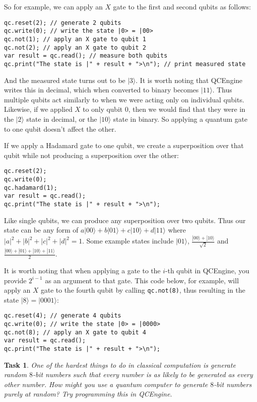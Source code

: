 \documentclass[twocolumn]{article}
\newtheorem{task}{Task}[section]
\begin{document}
So for example, we can apply an $X$ gate to the first and second qubits as follows:

\begin{lstlisting}
qc.reset(2); // generate 2 qubits
qc.write(0); // write the state |0> = |00>
qc.not(1); // apply an X gate to qubit 1
qc.not(2); // apply an X gate to qubit 2
var result = qc.read(); // measure both qubits
qc.print("The state is |" + result + ">\n"); // print measured state
\end{lstlisting}

And the measured state turns out to be $|3\rangle$. It is worth noting that QCEngine writes this in decimal, which when converted to binary becomes $|11\rangle$. Thus multiple qubits act similarly to when we were acting only on individual qubits. Likewise, if we applied $X$ to only qubit $0$, then we would find that they were in the $|2\rangle$ state in decimal, or the $|10\rangle$ state in binary. So applying a quantum gate to one qubit doesn't affect the other.

If we apply a Hadamard gate to one qubit, we create a superposition over that qubit while not producing a superposition over the other:

\begin{lstlisting}
qc.reset(2);
qc.write(0);
qc.hadamard(1);
var result = qc.read();
qc.print("The state is |" + result + ">\n");
\end{lstlisting}

Like single qubits, we can produce any superposition over two qubits. Thus our state can be any form of $a|00\rangle + b|01\rangle + c|10\rangle + d|11\rangle$ where $|a|^2 + |b|^2 + |c|^2 + |d|^2 = 1$. Some example states include $|01\rangle$, $\frac{|00\rangle + |10\rangle}{\sqrt{2}}$ and $\frac{|00\rangle + |01\rangle + |10\rangle + |11\rangle}{2}$.

It is worth noting that when applying a gate to the $i$-th qubit in QCEngine, you provide $2^{i-1}$ as an argument to that gate. This code below, for example, will apply an $X$ gate to the fourth qubit by calling \texttt{qc.not(8)}, thus resulting in the state $|8\rangle = |0001\rangle$:

\begin{lstlisting}
qc.reset(4); // generate 4 qubits
qc.write(0); // write the state |0> = |0000>
qc.not(8); // apply an X gate to qubit 4
var result = qc.read();
qc.print("The state is |" + result + ">\n");
\end{lstlisting}

\begin{task}
One of the hardest things to do in classical computation is generate random $8$-bit numbers such that every number is as likely to be generated as every other number. How might you use a quantum computer to generate $8$-bit numbers purely at random? Try programming this in QCEngine.
\end{task}
\end{document}

